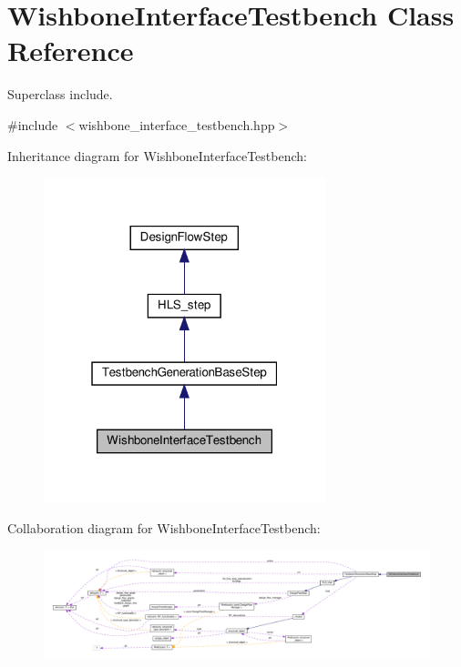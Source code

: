 \hypertarget{classWishboneInterfaceTestbench}{}\section{Wishbone\+Interface\+Testbench Class Reference}
\label{classWishboneInterfaceTestbench}


Superclass include.  




{\ttfamily \#include $<$wishbone\+\_\+interface\+\_\+testbench.\+hpp$>$}



Inheritance diagram for Wishbone\+Interface\+Testbench\+:
\nopagebreak
\begin{figure}[H]
\begin{center}
\leavevmode
\includegraphics[width=232pt]{d5/d3d/classWishboneInterfaceTestbench__inherit__graph}
\end{center}
\end{figure}


Collaboration diagram for Wishbone\+Interface\+Testbench\+:
\nopagebreak
\begin{figure}[H]
\begin{center}
\leavevmode
\includegraphics[width=350pt]{d9/d42/classWishboneInterfaceTestbench__coll__graph}
\end{center}
\end{figure}
